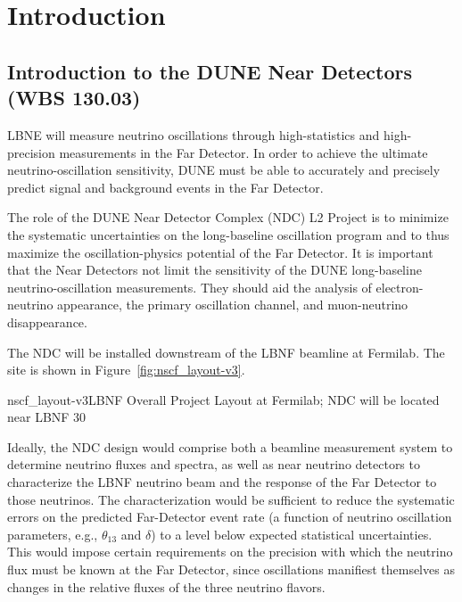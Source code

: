 \chapter{Introduction}  
\label{ch:nd-intro}


%
\clearpage
\section{Introduction to the DUNE Near Detectors (WBS 130.03)}
\label{sec:nd-intro-vol-intro}


LBNE will measure neutrino oscillations through high-statistics 
and high-precision measurements in the Far Detector. 
 In order to achieve the ultimate neutrino-oscillation sensitivity, DUNE must be able to accurately and 
precisely predict signal and background events in the Far Detector.

The role of the DUNE Near Detector Complex (NDC) L2 Project is to 
minimize the systematic uncertainties on 
the long-baseline oscillation program and to thus maximize the 
oscillation-physics potential of the Far Detector. It is important that the
 Near Detectors not limit the sensitivity of the 
DUNE long-baseline neutrino-oscillation measurements. 
They should aid the analysis of electron-neutrino 
appearance, the primary oscillation channel, and muon-neutrino disappearance. 

The NDC will be installed downstream of the LBNF beamline at Fermilab. The site is shown in Figure~\ref{fig:nscf_layout-v3}.

\begin{cdrfigure}{nscf_layout-v3}{LBNF Overall Project Layout at Fermilab; NDC will be located near LBNF 30}
\end{cdrfigure}

Ideally, the NDC design would comprise both a beamline measurement system to determine neutrino fluxes and spectra, as well as near neutrino detectors to characterize the LBNF neutrino beam and
the response of the Far Detector to those neutrinos.  The characterization would be sufficient to reduce the systematic errors
on the predicted Far-Detector event rate (a function of neutrino oscillation 
parameters, e.g., $\theta_{13}$ and $\delta$) to a level below expected statistical uncertainties.
This would impose certain requirements on
the precision with which the neutrino flux must be known at the Far Detector, since
oscillations manifiest themselves as changes in the relative fluxes of the three neutrino
flavors.

